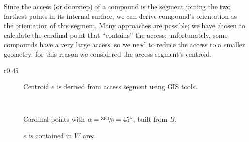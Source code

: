                 Since the access (or doorstep) of a compound is the segment joining the two farthest points in its internal surface, we can derive compound's orientation as the orientation of this segment. Many approaches are possible; we have chosen to calculate the cardinal point that ``contains'' the access; unfortunately, some compounds have a very large access, so we need to reduce the access to a smaller geometry: for this reason we considered the access segment's centroid.

                \begin{wrapfigure}{r}{0.45\textwidth}
                    \centering
                    \begin{subfigure}[b]{.4\columnwidth}
                        \centering
                        \begin{tikzpicture}[x=2.5pt,y=2.5pt,scale=0.09]
                             
                        \end{tikzpicture}
                        \caption{Centroid $e$ is derived from access segment using GIS tools.}
                        \label{fig:comp-orient-1}
                    \end{subfigure}\\
                    \vspace{0.02\textheight}
                    \begin{subfigure}[b]{.4\columnwidth}
                        \centering
                        \begin{tikzpicture}[x=2.5pt,y=2.5pt,scale=0.09]
                            
                        \end{tikzpicture}
                        \caption{Cardinal points with $\alpha=\sfrac{360}{8}=\SI{45}{\degree}$, built from $B$.}
                        \label{fig:comp-orient-2}
                    \end{subfigure}
                    \vspace{0.02\textheight}
                    \begin{subfigure}[b]{.4\columnwidth}
                        \centering
                        \begin{tikzpicture}[x=2.5pt,y=2.5pt,scale=0.09]
                            
                        \end{tikzpicture}
                        \caption{$e$ is contained in $W$ area.}

\end{subfigure}
\end{wrapfigure}
